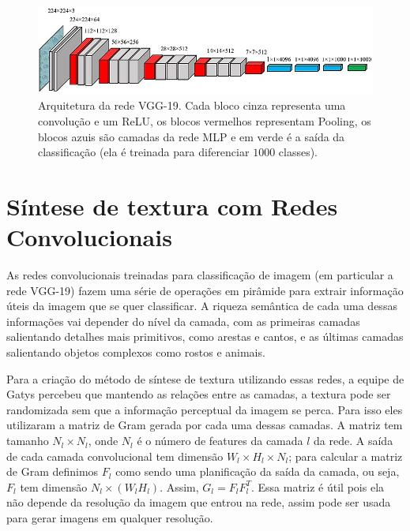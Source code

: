 \begin{figure}[!ht]
	\centering
	\includegraphics[width=\linewidth*5/6]{files/assets/deeplearning/vgg19.png}
	\caption{Arquitetura da rede VGG-19. Cada bloco cinza representa
	uma convolução e um ReLU, os blocos vermelhos representam 
	Pooling, os blocos azuis são camadas da rede MLP e em verde é a
	saída da classificação (ela é treinada para diferenciar $1000$
	classes).}
	\label{img:preview}
\end{figure}





\section{Síntese de textura com Redes Convolucionais}

As redes convolucionais
treinadas para classificação de imagem (em particular
a rede VGG-19) fazem uma série de operações em
pirâmide para extrair informação úteis da imagem que
se quer classificar. A riqueza semântica de cada
uma dessas informações vai depender do nível da camada,
com as primeiras camadas salientando detalhes
mais primitivos, como arestas e cantos, e as últimas
camadas salientando objetos complexos como rostos
e animais.


Para a criação do método de síntese de textura
utilizando essas redes, a equipe de Gatys percebeu que 
mantendo as relações entre as camadas,
a textura pode ser randomizada sem que 
a informação perceptual da imagem se perca.
Para isso eles utilizaram a matriz de Gram gerada por cada
uma dessas camadas. A matriz tem tamanho $N_l \times N_l$,
onde $N_l$ é o número de features da camada $l$ da rede.
A saída de cada camada convolucional tem dimensão
$W_l\times H_l \times N_l$; para calcular a matriz de Gram
definimos $F_l$ como sendo uma planificação da 
saída da camada, ou seja, $F_l$ tem dimensão $N_l \times (W_l H_l)$.
Assim, $G_l = F_lF_l^T$. Essa matriz é útil pois ela não 
depende da resolução da imagem que entrou na rede,
assim pode ser usada para gerar imagens em
qualquer resolução.

